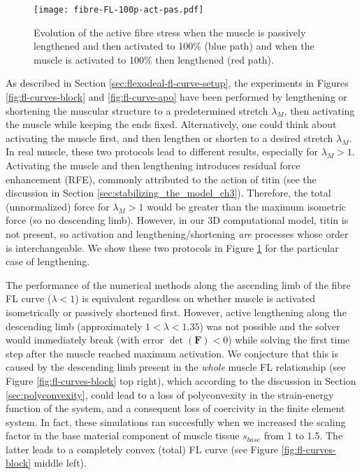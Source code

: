 \documentclass{sfuthesis}
\numberwithin{equation}{section}
\numberwithin{figure}{chapter}
\numberwithin{table}{chapter}
\theoremstyle{definition}
\def\*#1{{\mathbf{#1}}} %
\begin{document}
\begin{figure}
    \centering
    \texttt{[image: fibre-FL-100p-act-pas.pdf]}
    \caption{Evolution of the active fibre stress when the muscle is passively lengthened and then activated to 100\% (blue path) and when the muscle is activated to 100\% then lengthened (red path).
    \label{fig:act_len_len_act}}
\end{figure}

As described in Section \ref{sec:flexodeal-fl-curve-setup}, the experiments in Figures \ref{fig:fl-curves-block} and \ref{fig:fl-curve-apo} have been performed by lengthening or shortening the muscular structure to a predetermined stretch $\lambda_M$, then activating the muscle while keeping the ends fixed. Alternatively, one could think about activating the muscle first, and then lengthen or shorten to a desired stretch $\lambda_M$. In real muscle, these two protocols lead to different results, especially for $\lambda_M > 1$. Activating the muscle and then lengthening introduces residual force enhancement (RFE), commonly attributed to the action of titin (see the discussion in Section \ref{sec:stabilizing_the_model_ch3}). Therefore, the total (unnormalized) force for $\lambda_M > 1$ would be greater than the maximum isometric force (so no descending limb). However, in our 3D computational model, titin is not present, so activation and lengthening/shortening \textit{are} processes whose order is interchangeable. We show these two protocols in Figure \ref{fig:act_len_len_act} for the particular case of lengthening.

The performance of the numerical methods along the ascending limb of the fibre FL curve ($\lambda < 1$) is equivalent regardless on whether muscle is activated isometrically or passively shortened first. However, active lengthening along the descending limb (approximately $1 < \lambda < 1.35$) was not possible and the solver would immediately break (with error $\det(\*F) < 0$) while solving the first time step after the muscle reached maximum activation. We conjecture that this is caused by the descending limb present in the \textit{whole} muscle FL relationship (see Figure \ref{fig:fl-curves-block} top right), which according to the discussion in Section \ref{sec:polyconvexity}, could lead to a loss of polyconvexity in the strain-energy function of the system, and a consequent loss of coercivity in the finite element system. In fact, these simulations ran succesfully when we increased the scaling factor in the base material component of muscle tissue $s_{base}$ from 1 to 1.5. The latter leads to a completely convex (total) FL curve (see Figure \ref{fig:fl-curves-block} middle left).
\end{document}
